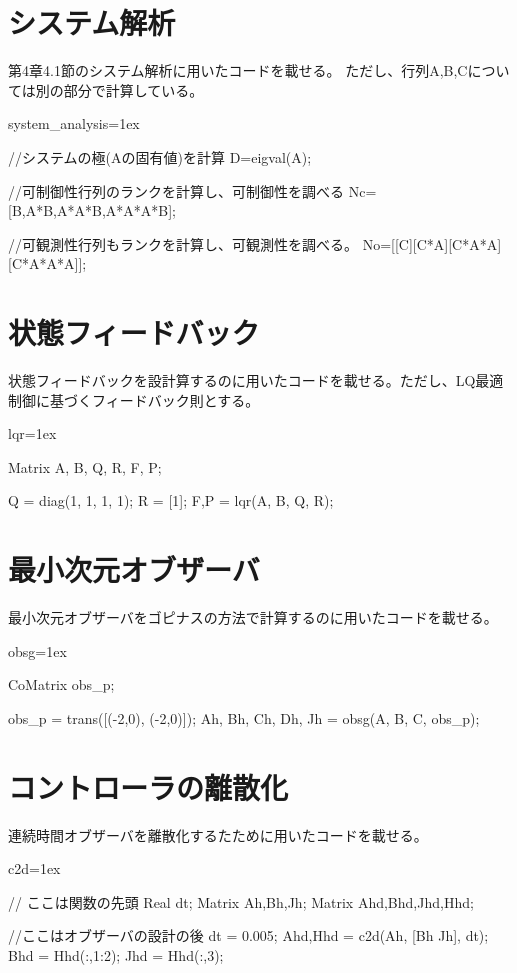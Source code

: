 \section{システム解析}
	第4章4.1節のシステム解析に用いたコードを載せる。
	ただし、行列A,B,Cについては別の部分で計算している。
	\begin{breakitembox}[l]{system\_analysis}\baselineskip=1ex
		\begin{verbatimtab}[4]
//システムの極(Aの固有値)を計算
D=eigval(A);

//可制御性行列のランクを計算し、可制御性を調べる
Nc=[B,A*B,A*A*B,A*A*A*B];

//可観測性行列もランクを計算し、可観測性を調べる。
No=[[C][C*A][C*A*A][C*A*A*A]];
		\end{verbatimtab}
	\end{breakitembox}
\section{状態フィードバック}
	状態フィードバックを設計算するのに用いたコードを載せる。ただし、LQ最適制御に基づくフィードバック則とする。
	\begin{breakitembox}[l]{lqr}\baselineskip=1ex
		\begin{verbatimtab}[4]
Matrix A, B, Q, R, F, P;

Q = diag(1, 1, 1, 1);
R = [1];
{F,P} = lqr(A, B, Q, R);
		\end{verbatimtab}
	\end{breakitembox}
\section{最小次元オブザーバ}
	最小次元オブザーバをゴピナスの方法で計算するのに用いたコードを載せる。
	\begin{breakitembox}[l]{obsg}\baselineskip=1ex
		\begin{verbatimtab}[4]
CoMatrix obs_p;

obs_p = trans([(-2,0), (-2,0)]);
{Ah, Bh, Ch, Dh, Jh} = obsg(A, B, C, obs_p);
		\end{verbatimtab}
	\end{breakitembox}
\section{コントローラの離散化}
	連続時間オブザーバを離散化するたために用いたコードを載せる。
	\begin{breakitembox}[l]{c2d}\baselineskip=1ex
		\begin{verbatimtab}[4]
// ここは関数の先頭
Real dt;
Matrix Ah,Bh,Jh;
Matrix Ahd,Bhd,Jhd,Hhd;

//ここはオブザーバの設計の後
dt = 0.005;
{Ahd,Hhd} = c2d(Ah, [Bh Jh], dt);
Bhd = Hhd(:,1:2);
Jhd = Hhd(:,3);
		\end{verbatimtab}
	\end{breakitembox}
